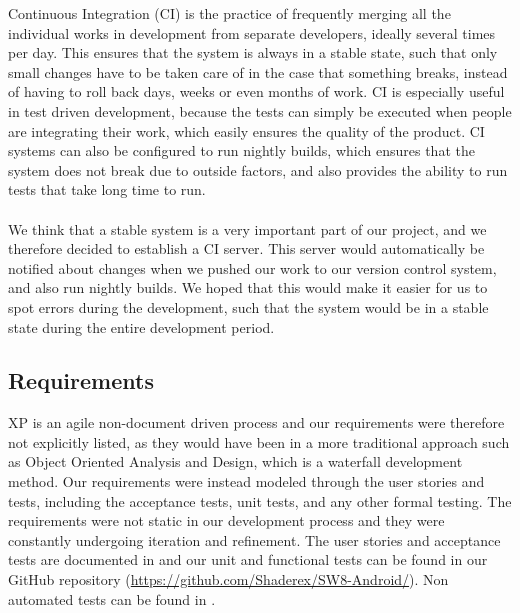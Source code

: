 Continuous Integration (CI) is the practice of frequently merging all the individual works in development from separate developers, ideally several times per day. This ensures that the system is always in a stable state, such that only small changes have to be taken care of in the case that something breaks, instead of having to roll back days, weeks or even months of work. CI is especially useful in test driven development, because the tests can simply be executed when people are integrating their work, which easily ensures the quality of the product. CI systems can also be configured to run nightly builds, which ensures that the system does not break due to outside factors, and also provides the ability to run tests that take long time to run.
\\\\
We think that a stable system is a very important part of our project, and we therefore decided to establish a CI server. This server would automatically be notified about changes when we pushed our work to our version control system, and also run nightly builds. We hoped that this would make it easier for us to spot errors during the development, such that the system would be in a stable state during the entire development period. 

\subsection{Requirements}

XP is an agile non-document driven process and our requirements were therefore not explicitly listed, as they would have been in a more traditional approach such as Object Oriented Analysis and Design, which is a waterfall development method. Our requirements were instead modeled through the user stories and tests, including the acceptance tests, unit tests, and any other formal testing. The requirements were not static in our development process and they were constantly undergoing iteration and refinement. The user stories and acceptance tests are documented in  and our unit and functional tests can be found in our GitHub repository (\href{https://github.com/Shaderex/SW8-Android/}{https://github.com/Shaderex/SW8-Android/}). Non automated tests can be found in .

